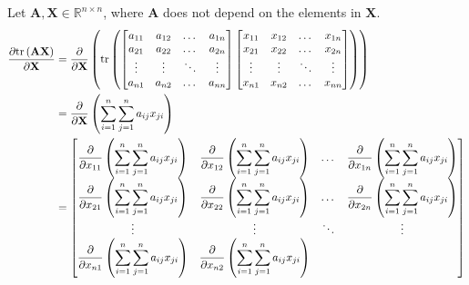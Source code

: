 \documentclass{article}
\newcommand{\tr}[1]{\ensuremath{\textnormal{tr}\left(#1\right)}} %
\begin{document}
Let \(\mathbf{A}, \mathbf{X} \in \mathbb{R}^{n\times n}\), where \(\mathbf{A}\) does not depend on the elements in \(\mathbf{X}\).
\begin{align*}
    \frac{\partial \textnormal{tr}\left(\mathbf{A} \mathbf{X}\right)}{\partial \mathbf{X}} &= \frac{\partial}{\partial \mathbf{X}} \left( \tr{\begin{bmatrix}
        a_{11} & a_{12} & \dots & a_{1n} \\
        a_{21} & a_{22} & \dots & a_{2n} \\
        \vdots & \vdots & \ddots & \vdots \\
        a_{n1} & a_{n2} & \dots & a_{nn} \\
    \end{bmatrix}
    \begin{bmatrix}
        x_{11} & x_{12} & \dots & x_{1n} \\
        x_{21} & x_{22} & \dots & x_{2n} \\
        \vdots & \vdots & \ddots & \vdots \\
        x_{n1} & x_{n2} & \dots & x_{nn} \\
    \end{bmatrix} \right)} \\
    &= \frac{\partial}{\partial \mathbf{X}} \left( \sum_{i = 1}^{n} \sum_{j = 1}^{n} a_{ij}x_{ji} \right) \\
    &= \begin{bmatrix}
        \displaystyle \frac{\partial}{\partial x_{11}} \left( \sum_{i = 1}^{n} \sum_{j = 1}^{n} a_{ij}x_{ji} \right) & 
        \displaystyle \frac{\partial}{\partial x_{12}} \left( \sum_{i = 1}^{n} \sum_{j = 1}^{n} a_{ij}x_{ji} \right) & 
        \dots & 
        \displaystyle \frac{\partial}{\partial x_{1n}} \left( \sum_{i = 1}^{n} \sum_{j = 1}^{n} a_{ij}x_{ji} \right) \\
        \displaystyle \frac{\partial}{\partial x_{21}} \left( \sum_{i = 1}^{n} \sum_{j = 1}^{n} a_{ij}x_{ji} \right) & 
        \displaystyle \frac{\partial}{\partial x_{22}} \left( \sum_{i = 1}^{n} \sum_{j = 1}^{n} a_{ij}x_{ji} \right) & 
        \dots & 
        \displaystyle \frac{\partial}{\partial x_{2n}} \left( \sum_{i = 1}^{n} \sum_{j = 1}^{n} a_{ij}x_{ji} \right) \\
        \vdots & \vdots & \ddots & \vdots \\
        \displaystyle \frac{\partial}{\partial x_{n1}} \left( \sum_{i = 1}^{n} \sum_{j = 1}^{n} a_{ij}x_{ji} \right) & 
        \displaystyle \frac{\partial}{\partial x_{n2}} \left( \sum_{i = 1}^{n} \sum_{j = 1}^{n} a_{ij}x_{ji} \right) & 

\end{bmatrix}
\end{align*}
\end{document}
